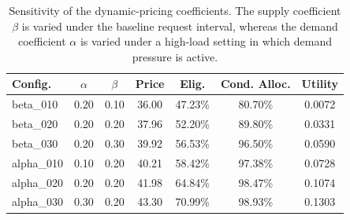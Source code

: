 \begin{table}[t]
\centering
\caption{Sensitivity of the dynamic-pricing coefficients. The supply coefficient $\beta$ is varied under the baseline request interval, whereas the demand coefficient $\alpha$ is varied under a high-load setting in which demand pressure is active.}
\label{tab:c25b_pricing_sensitivity}
\begin{tabular}{lcccccc}
\hline
Config. & $\alpha$ & $\beta$ & Price & Elig. & Cond. Alloc. & Utility \\
\hline
beta_010 & 0.20 & 0.10 & 36.00 & 47.23\% & 80.70\% & 0.0072 \\
beta_020 & 0.20 & 0.20 & 37.96 & 52.20\% & 89.80\% & 0.0331 \\
beta_030 & 0.20 & 0.30 & 39.92 & 56.53\% & 96.50\% & 0.0590 \\
alpha_010 & 0.10 & 0.20 & 40.21 & 58.42\% & 97.38\% & 0.0728 \\
alpha_020 & 0.20 & 0.20 & 41.98 & 64.84\% & 98.47\% & 0.1074 \\
alpha_030 & 0.30 & 0.20 & 43.30 & 70.99\% & 98.93\% & 0.1303 \\
\hline
\end{tabular}
\end{table}
